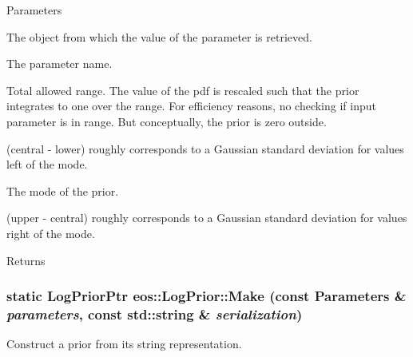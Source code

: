 \begin{DoxyParams}{Parameters}
\item[{\em parameters}]The object from which the value of the parameter is retrieved. \item[{\em name}]The parameter name. \item[{\em range}]Total allowed range. The value of the pdf is rescaled such that the prior integrates to one over the range. For efficiency reasons, no checking if input parameter is in range. But conceptually, the prior is zero outside. \item[{\em lower}](central -\/ lower) roughly corresponds to a Gaussian standard deviation for values left of the mode. \item[{\em central}]The mode of the prior. \item[{\em upper}](upper -\/ central) roughly corresponds to a Gaussian standard deviation for values right of the mode. \end{DoxyParams}
\begin{DoxyReturn}{Returns}

\end{DoxyReturn}
\hypertarget{classeos_1_1LogPrior_a48409439aeaa34a6d0bf47ef1902749a}{
\subsubsection[{Make}]{\setlength{\rightskip}{0pt plus 5cm}static {\bf LogPriorPtr} eos::LogPrior::Make (const {\bf Parameters} \& {\em parameters}, \/  const std::string \& {\em serialization})}}
\label{classeos_1_1LogPrior_a48409439aeaa34a6d0bf47ef1902749a}
Construct a prior from its string representation.


